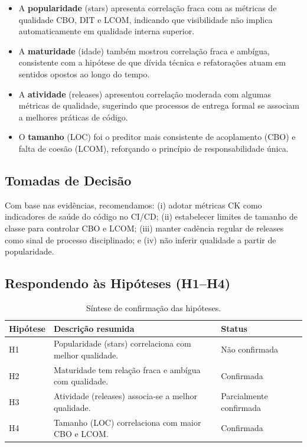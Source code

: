 \documentclass[10pt,a4paper,twocolumn]{article}
\begin{document}
\begin{itemize}
  \item A \textbf{popularidade} (stars) apresenta correlação fraca com as
    métricas de qualidade CBO, DIT e LCOM, indicando que visibilidade não
    implica automaticamente em qualidade interna superior.

  \item A \textbf{maturidade} (idade) também mostrou correlação fraca e
    ambígua, consistente com a hipótese de que dívida técnica e refatorações
    atuam em sentidos opostos ao longo do tempo.

  \item A \textbf{atividade} (releases) apresentou correlação moderada com
    algumas métricas de qualidade, sugerindo que processos de entrega formal
    se associam a melhores práticas de código.

  \item O \textbf{tamanho} (LOC) foi o preditor mais consistente de
    acoplamento (CBO) e falta de coesão (LCOM), reforçando o princípio de
    responsabilidade única.
\end{itemize}

\subsection{Tomadas de Decisão}

Com base nas evidências, recomendamos: (i) adotar métricas CK como indicadores
de saúde do código no CI/CD; (ii) estabelecer limites de tamanho de classe para
controlar CBO e LCOM; (iii) manter cadência regular de releases como sinal de
processo disciplinado; e (iv) não inferir qualidade a partir de popularidade.

\subsection{Respondendo às Hipóteses (H1--H4)}

\begin{table}[H]
  \centering
  \caption{Síntese de confirmação das hipóteses.}
  \label{tab:hipoteses}
  \small
  \begin{tabularx}{\textwidth}{lXl}
    \toprule
    Hipótese & Descrição resumida & Status \\
    \midrule
    H1 & Popularidade (stars) correlaciona com melhor qualidade. & Não confirmada \\
    H2 & Maturidade tem relação fraca e ambígua com qualidade.   & Confirmada \\
    H3 & Atividade (releases) associa-se a melhor qualidade.     & Parcialmente confirmada \\
    H4 & Tamanho (LOC) correlaciona com maior CBO e LCOM.        & Confirmada \\
    \bottomrule
  \end{tabularx}
\end{table}

\clearpage
\end{document}
